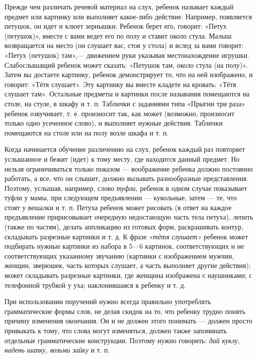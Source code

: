\documentclass[a5paper]{book}
\renewcommand{\emph}[1]{\textit{#1}}
\begin{document}
Прежде чем различать речевой материал на слух, ребенок называет каждый
предмет или картинку или выполняет какое-либо действие. Например,
появляется петушок, он идет и клюет зернышки. Ребенок берет его,
говорит: «Петух (петушок)», вместе с вами ведет его по полу и ставит
около стула. Малыш возвращается на место (он слушает вас, стоя у стола)
и вслед за вами говорит: «Петух (петушок) там»,--- движением руки
указывая местонахождение игрушки. Слабослышащий ребенок может сказать:
«Петушок там, около стула (на полу)». Затем вы достаете картинку,
ребенок демонстрирует то, что на ней изображено, и говорит: «Тётя
слушает». Эту картинку вы вместе кладете на кровать: «Тётя слушает там».
Остальные предметы и картинки после называния помещаются на столе, на
стуле, в шкафу и т. п. Таблички с заданиями типа «Прыгни три раза»
ребенок озвучивает, т. е. произносит так, как может (возможно,
произносит только одно усеченное слово), и выполняет нужные действия.
Таблички помещаются на столе или на полу возле шкафа и т. п.

Когда начинается обучение различению на слух, ребенок каждый раз
повторяет услышанное и бежит (идет) к тому месту, где находится данный
предмет. Но нельзя ограничиваться только показом --- воображение ребенка
должно постоянно работать, а все, что он слышит, должно вызывать
разнообразные представления. Поэтому, услышав, например, слово
\emph{туфли,} ребенок в одном случае показывает туфли у мамы, при
следующем предъявлении --- кукольные, затем --- те, что стоят у вешалки
и т. п. Петуха ребенок может рисовать (в ответ на каждое предъявление
пририсовывает очередную недостающую часть тела петуха), лепить (также по
частям), делать аппликацию из готовых форм, раскрашивать контур,
складывать разрезные картинки и т. д. К фразе «\emph{тётя слушает»}
ребенок может подбирать нужные картинки из набора в 5---6 картинок,
соответствующих и не соответствующих указанному звучанию (картинки с
изображением мужчин, женщин, зверюшек, часть которых слушает, а часть
выполняет другие действия); может складывать разрезные картинки, где
женщина изображена с наушниками; с телефонной трубкой у уха;
наклонившаяся к ребенку и т. д.

При использовании поручений нужно всегда правильно употреблять
грамматические формы слов, не делая скидок на то, что ребенку трудно
понять причину изменения окончания. Он и не должен этого понимать ---
должен просто привыкать к тому, что слова могут изменяться, должен также
запоминать отдельные грамматические конструкции. Поэтому нужно говорить:
\emph{дай куклу, надень шапку, возьми зайку} и т. п.
\end{document}
